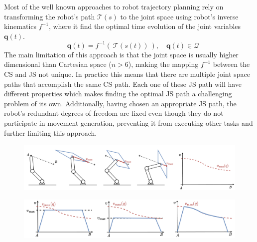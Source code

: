 Most of the well known approaches to robot trajectory planning rely on transforming the robot's path $\mathcal{T}(s)$ to the joint space using robot's inverse kinematics $f^{-1}$, where it find the optimal time evolution of the joint variables $\bm{q}(t)$.
\begin{equation}
 \quad \bm{q}(t) = f^{-1}\left(~\mathcal{T}\left(s\left(t\right)\right)~\right), \quad\bm{q}(t) \in \mathcal{Q} 
\end{equation}
The main limitation of this approach is that the joint space is usually higher dimensional than Cartesian space ($n>6$), making the mapping $f^{-1}$ between the CS and JS not unique. In practice this means that there are multiple joint space paths that accomplish the same CS path. Each one of these JS path will have different properties which makes finding the optimal JS path a challenging problem of its own. Additionally, having chosen an appropriate JS path, the robot's redundant degrees of freedom are fixed even though they do not participate in movement generation, preventing it from executing other tasks and further limiting this approach.


\begin{figure}[!t]
    \centering 
    \includegraphics[width=\linewidth]{Papers/imgs/motivation_topca.pdf}
    \caption{}
    \label{fig:motiv_topca}
\end{figure}

\begin{figure}[!t]
    \centering 
    \includegraphics[width=\linewidth]{Papers/imgs/unre_over_poly.pdf}
    \caption{}
    \label{fig:under_over}
\end{figure}



